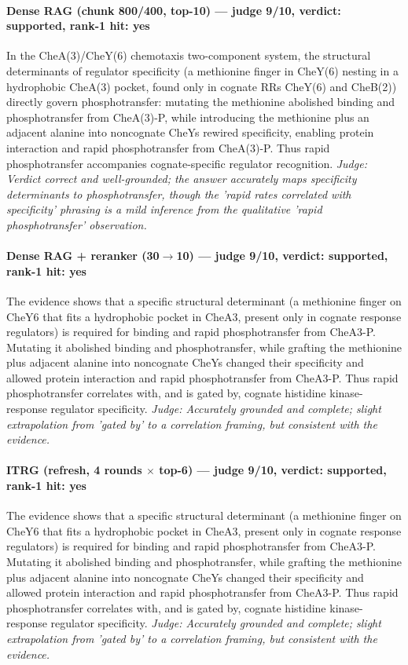 \documentclass[sigconf, review, anonymous]{acmart}
\begin{document}
\paragraph{Dense RAG (chunk 800/400, top-10) --- judge 9/10, verdict: supported, rank-1 hit: yes}
\noindent In the CheA(3)/CheY(6) chemotaxis two-component system, the structural determinants of regulator specificity (a methionine finger in CheY(6) nesting in a hydrophobic CheA(3) pocket, found only in cognate RRs CheY(6) and CheB(2)) directly govern phosphotransfer: mutating the methionine abolished binding and phosphotransfer from CheA(3)-P, while introducing the methionine plus an adjacent alanine into noncognate CheYs rewired specificity, enabling protein interaction and rapid phosphotransfer from CheA(3)-P. Thus rapid phosphotransfer accompanies cognate-specific regulator recognition.
\noindent\small\textit{Judge: Verdict correct and well-grounded; the answer accurately maps specificity determinants to phosphotransfer, though the 'rapid rates correlated with specificity' phrasing is a mild inference from the qualitative 'rapid phosphotransfer' observation.}
\paragraph{Dense RAG + reranker (30$\to$10) --- judge 9/10, verdict: supported, rank-1 hit: yes}
\noindent The evidence shows that a specific structural determinant (a methionine finger on CheY6 that fits a hydrophobic pocket in CheA3, present only in cognate response regulators) is required for binding and rapid phosphotransfer from CheA3-P. Mutating it abolished binding and phosphotransfer, while grafting the methionine plus adjacent alanine into noncognate CheYs changed their specificity and allowed protein interaction and rapid phosphotransfer from CheA3-P. Thus rapid phosphotransfer correlates with, and is gated by, cognate histidine kinase-response regulator specificity.
\noindent\small\textit{Judge: Accurately grounded and complete; slight extrapolation from 'gated by' to a correlation framing, but consistent with the evidence.}
\paragraph{ITRG (refresh, 4 rounds $\times$ top-6) --- judge 9/10, verdict: supported, rank-1 hit: yes}
\noindent The evidence shows that a specific structural determinant (a methionine finger on CheY6 that fits a hydrophobic pocket in CheA3, present only in cognate response regulators) is required for binding and rapid phosphotransfer from CheA3-P. Mutating it abolished binding and phosphotransfer, while grafting the methionine plus adjacent alanine into noncognate CheYs changed their specificity and allowed protein interaction and rapid phosphotransfer from CheA3-P. Thus rapid phosphotransfer correlates with, and is gated by, cognate histidine kinase-response regulator specificity.
\noindent\small\textit{Judge: Accurately grounded and complete; slight extrapolation from 'gated by' to a correlation framing, but consistent with the evidence.}
\end{document}
